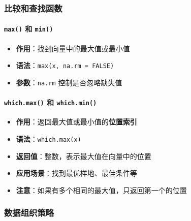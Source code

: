 \documentclass[
]{book}
\providecommand{\tightlist}{%
  \setlength{\itemsep}{0pt}\setlength{\parskip}{0pt}}
\begin{document}
\hypertarget{ux6bd4ux8f83ux548cux67e5ux627eux51fdux6570}{%
\subsubsection{比较和查找函数}\label{ux6bd4ux8f83ux548cux67e5ux627eux51fdux6570}}

\hypertarget{max-ux548c-min}{%
\paragraph{\texorpdfstring{\texttt{max()} 和 \texttt{min()}}{max() 和 min()}}\label{max-ux548c-min}}

\begin{itemize}
\tightlist
\item
  \textbf{作用}：找到向量中的最大值或最小值
\item
  \textbf{语法}：\texttt{max(x,\ na.rm\ =\ FALSE)}
\item
  \textbf{参数}：\texttt{na.rm} 控制是否忽略缺失值
\end{itemize}

\hypertarget{which.max-ux548c-which.min}{%
\paragraph{\texorpdfstring{\texttt{which.max()} 和 \texttt{which.min()}}{which.max() 和 which.min()}}\label{which.max-ux548c-which.min}}

\begin{itemize}
\tightlist
\item
  \textbf{作用}：返回最大值或最小值的\textbf{位置索引}
\item
  \textbf{语法}：\texttt{which.max(x)}
\item
  \textbf{返回值}：整数，表示最大值在向量中的位置
\item
  \textbf{应用场景}：找到最优样地、最佳条件等
\item
  \textbf{注意}：如果有多个相同的最大值，只返回第一个的位置
\end{itemize}

\hypertarget{ux6570ux636eux7ec4ux7ec7ux7b56ux7565}{%
\subsubsection{数据组织策略}\label{ux6570ux636eux7ec4ux7ec7ux7b56ux7565}}
\end{document}
